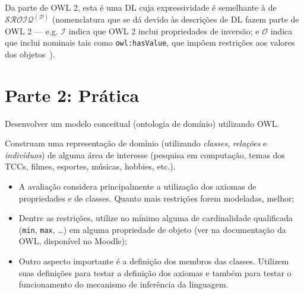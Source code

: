 \documentclass[answers]{exam}
\begin{document}
\begin{questions}
\begin{answer}
            Da parte de OWL 2, esta é uma DL cuja expressividade é semelhante à
            de $\mathcal{SROIQ^{(D)}}$ (nomenclatura que se dá devido às
            descrições de DL fazem parte de OWL 2 --- e.g. $\mathcal{I}$ indica
            que OWL 2 inclui propriedades de inversão; e $\mathcal{O}$ indica
            que inclui nominais tais como \texttt{owl:hasValue}, que impõem
            restrições aos valores dos
            objetos~\cite{wikipedia:description-logic}).


        \end{answer}
    \end{questions}

    \section{Parte 2: Prática}
    \begin{questions}
        \question{}
        Desenvolver um modelo conceitual (ontologia de domínio) utilizando
        OWL\@.

        Construam uma representação de domínio (utilizando \emph{classes},
        \emph{relações} e \emph{indivíduos}) de alguma área de interesse
        (pesquisa em computação, temas dos TCCs, filmes, esportes, músicas,
        hobbies, etc.).

        \begin{superframe}
            \begin{itemize}
                \item A avaliação considera principalmente a utilização dos
                    axiomas de propriedades e de classes. Quanto mais
                    restrições forem modeladas, melhor;

                \item Dentre as restrições, utilize no mínimo alguma de
                    cardinalidade qualificada (\texttt{min}, \texttt{max},
                    \ldots) em alguma propriedade de objeto (ver na
                    documentação da OWL, disponível no Moodle);

                \item Outro aspecto importante é a definição dos membros das
                    classes. Utilizem suas definições para testar a definição
                    dos axiomas e também para testar o funcionamento do
                    mecanismo de inferência da linguagem.
            \end{itemize}
        \end{superframe}
    \end{questions}

    
    
    \nocite{*}
\end{document}

